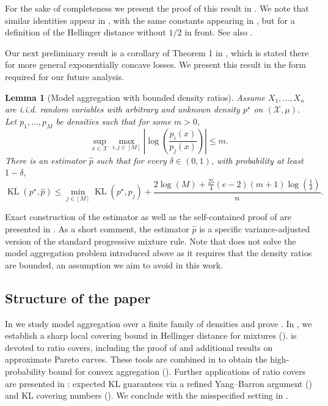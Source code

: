 \documentclass[11pt]{article}
\makeatletter
\renewcommand{\le}{\leqslant}
\newcommand{\M}{M}
\newcommand{\X}{\mathcal{X}}
\newcommand{\iid}{i.i.d.\@\xspace}
\newcommand{\kl}{\operatorname{KL}}
\newcommand{\kll}[2]{\kl ({#1}, {#2})}
\newtheorem{lemma}{Lemma}
\theoremstyle{definition}
\theoremstyle{remark}
\makeatother
\begin{document}
For the sake of completeness we present the proof of this result in . We note that similar identities appear in \citep[Lemma 5]{birge1998minimum}, \cite[Lemma 4.4]{birge1983approximation} with the same constants appearing in \cite[Fact 4]{tang2022divergence}, but for a definition of the Hellinger distance without $1/2$ in front. See also \cite{birge1993rates}.

Our next preliminary result is a corollary of Theorem 1 in \cite{vanderhoeven2023high}, which is stated there for more general exponentially concave losses. We present this result in the form required for our future analysis.

\begin{lemma}[Model aggregation with bounded density ratios]
  \label{lem:onlinetobatch}
  Assume $X_{1},\ldots,X_{n}$ are
\iid random variables with arbitrary and unknown density $p^\star$ on $(\X, \mu)$.
Let $p_{1},\ldots,p_{\M}$ be densities such that for some $m>0$,
\[
\sup_{x \in \X}\max_{i,j\in[M]}\left|\log\left(\frac{p_i(x)}{p_j(x)}\right)\right|\le m.
\]
There is an estimator $\widehat{p}$ such that for every $\delta\in(0,1)$, with probability at least $1-\delta$,
\begin{equation}
\label{eq:main-theorem-bound}
\kll{p^\star}{\widehat{p}} \le \min_{j \in [M]}\kll{p^\star}{p_j} + \frac{2\log\left(M\right)+\frac{25}{4}\left(e-2\right)\left(m+1\right)\log\left(\frac{1}{\delta}\right)}{n} .
\end{equation}
\end{lemma}

Exact construction of the estimator as well as the self-contained proof of  are presented in . As a short comment, the estimator $\widehat{p}$ is a specific variance-adjusted version of the standard progressive mixture rule. Note that 
does not solve the model aggregation problem introduced above as it requires that the density ratios are bounded, an assumption we aim to avoid in this work.

\subsection{Structure of the paper}
In  we study model aggregation over a finite family of densities and prove . 
In , we establish a sharp local covering bound in Hellinger distance for mixtures ().
 is devoted to ratio covers, including the proof of  and additional results on approximate Pareto curves.
These tools are combined in  to obtain the high-probability bound for convex aggregation (). 
Further applications of ratio covers are presented in : expected KL guarantees via a refined Yang--Barron argument () and KL covering numbers (). 
We conclude with the misspecified setting in . 
\end{document}
